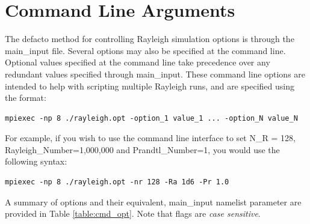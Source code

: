 \clearpage
\section{Command Line Arguments}\label{sec:cmd}
The defacto method for controlling Rayleigh simulation options is through the main\_input file.  Several options may also be specified at the command line.  Optional values specified at the command line take precedence over any redundant values specified through main\_input.  These command line options are intended to help with scripting multiple Rayleigh runs, and are specified using the format:
\begin{lstlisting}
mpiexec -np 8 ./rayleigh.opt -option_1 value_1 ... -option_N value_N  
\end{lstlisting}
For example, if you wish to use the command line interface to set N\_R = 128, Rayleigh\_Number=1,000,000 and Prandtl\_Number=1, you would use the following syntax:
\begin{lstlisting}
mpiexec -np 8 ./rayleigh.opt -nr 128 -Ra 1d6 -Pr 1.0  
\end{lstlisting}
A summary of options and their equivalent, main\_input namelist parameter are provided in Table \ref{table:cmd_opt}.  Note that flags are \textit{case sensitive}.  

